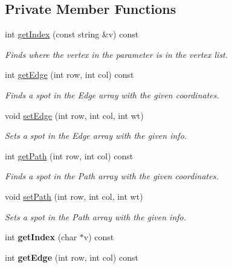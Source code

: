 \subsection*{Private Member Functions}
\begin{DoxyCompactItemize}
\item 
int \hyperlink{class_weighted_graph_a0c6d1c040128d1818ab3b38ff72723a4}{get\+Index} (const string \&v) const 
\begin{DoxyCompactList}\small\item\em Finds where the vertex in the parameter is in the vertex list. \end{DoxyCompactList}\item 
int \hyperlink{class_weighted_graph_aeda0f97771058c4ca642432cef88f52e}{get\+Edge} (int row, int col) const 
\begin{DoxyCompactList}\small\item\em Finds a spot in the Edge array with the given coordinates. \end{DoxyCompactList}\item 
void \hyperlink{class_weighted_graph_aca51b1a746202621345709290a0ddd98}{set\+Edge} (int row, int col, int wt)
\begin{DoxyCompactList}\small\item\em Sets a spot in the Edge array with the given info. \end{DoxyCompactList}\item 
int \hyperlink{class_weighted_graph_a878188104e22c8ec0960d723ef4f58d9}{get\+Path} (int row, int col) const 
\begin{DoxyCompactList}\small\item\em Finds a spot in the Path array with the given coordinates. \end{DoxyCompactList}\item 
void \hyperlink{class_weighted_graph_a7872c78e6db2c55fc064b121303bb9d4}{set\+Path} (int row, int col, int wt)
\begin{DoxyCompactList}\small\item\em Sets a spot in the Path array with the given info. \end{DoxyCompactList}\item 
\hypertarget{class_weighted_graph_ababe06235c182b7e5278fcf4a627e143}{int {\bfseries get\+Index} (char $\ast$v) const }\label{class_weighted_graph_ababe06235c182b7e5278fcf4a627e143}

\item 
\hypertarget{class_weighted_graph_aeda0f97771058c4ca642432cef88f52e}{int {\bfseries get\+Edge} (int row, int col) const }\label{class_weighted_graph_aeda0f97771058c4ca642432cef88f52e}


\end{DoxyCompactItemize}
